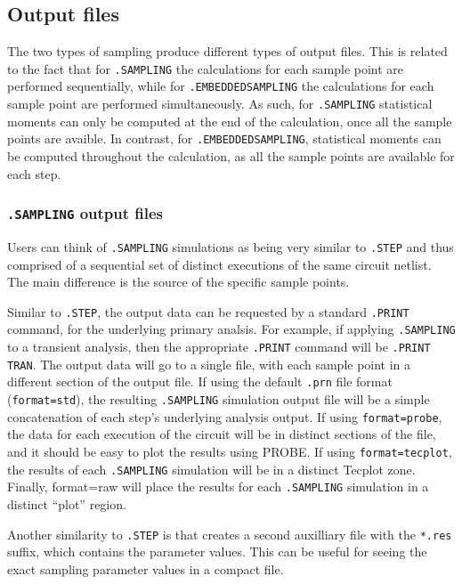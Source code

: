 \subsection{Output files}
\label{sampling_output_files}

The two types of sampling produce different types of output files.  This is 
related to the fact that for \texttt{.SAMPLING} the calculations for each sample 
point are performed sequentially, while for \texttt{.EMBEDDEDSAMPLING} the 
calculations for each sample point are performed simultaneously.  As such, 
for \texttt{.SAMPLING} statistical moments can only be computed at the end 
of the calculation, once all the sample points are avaible.  In contrast, 
for \texttt{.EMBEDDEDSAMPLING}, statistical moments can be computed throughout 
the calculation, as all the sample points are available for each step.

\subsubsection{\texttt{.SAMPLING} output files}
Users can think of \texttt{.SAMPLING} simulations as being very similar 
to \texttt{.STEP} and thus comprised of a sequential set of distinct executions
of the same circuit netlist. The main difference is the source of the specific sample points.

Similar to \texttt{.STEP}, the output data can be requested by a standard \texttt{.PRINT} command, for the underlying primary analsis.
For example, if applying \texttt{.SAMPLING} to a transient analysis, then the appropriate \texttt{.PRINT} command will be \texttt{.PRINT TRAN}.
The output data will go to a single file, with each sample point in a different section of the output file.
If using the default \texttt{.prn} file format (\texttt{format=std}), the 
resulting \texttt{.SAMPLING} simulation output file will be a simple concatenation of
each step's underlying analysis output.
If using \texttt{format=probe}, the data for each execution of the circuit
will be in distinct sections of the file, and it should be easy to 
plot the results using PROBE.  If using \texttt{format=tecplot}, 
the results of each \texttt{.SAMPLING} simulation will be in a distinct
Tecplot zone. Finally, format=raw will place the results for each \texttt{.SAMPLING} 
simulation in a distinct ``plot'' region. 

Another similarity to \texttt{.STEP} is that \Xyce{} creates a second auxilliary file with the \texttt{*.res} 
suffix, which contains the parameter values.    This can be useful for seeing the exact sampling parameter values in a compact file.

